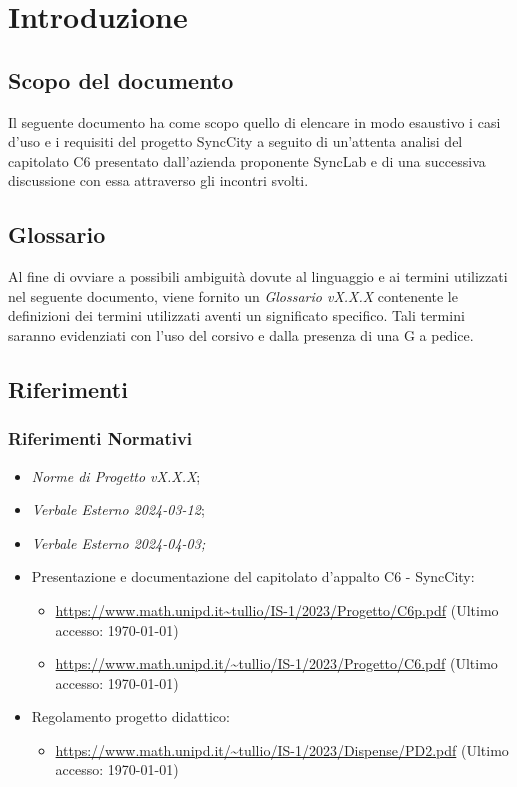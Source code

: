 \documentclass[8pt]{article}
\begin{document}
\section{Introduzione}
\subsection{Scopo del documento}
Il seguente documento ha come scopo quello di elencare in modo esaustivo i casi d'uso e i requisiti
del progetto SyncCity a seguito di un'attenta analisi del capitolato C6 presentato dall'azienda proponente SyncLab e di una successiva discussione con essa attraverso gli incontri svolti.

\subsection{Glossario}
Al fine di ovviare a possibili ambiguità dovute al linguaggio e ai termini utilizzati nel seguente
documento, viene fornito un \textit{Glossario vX.X.X} contenente le definizioni dei termini utilizzati aventi un significato specifico. Tali termini saranno evidenziati con l'uso del corsivo e dalla presenza di una G a pedice.
\subsection{Riferimenti}
\subsubsection{Riferimenti Normativi}
\begin{itemize}
	\setlength\itemsep{0em}
	\item \textit{Norme di Progetto vX.X.X};	
	\item \textit{Verbale Esterno 2024-03-12};
	\item \textit{Verbale Esterno 2024-04-03;}
  \item Presentazione e documentazione del capitolato d’appalto C6 - SyncCity:
	\begin{itemize}
		\item \href{https://www.math.unipd.it/~tullio/IS-1/2023/Progetto/C6p.pdf}{https://www.math.unipd.it\textasciitilde{}tullio/IS-1/2023/Progetto/C6p.pdf} (Ultimo accesso: \today)
		\item \href{https://www.math.unipd.it/~tullio/IS-1/2023/Progetto/C6.pdf}{https://www.math.unipd.it/\textasciitilde{}tullio/IS-1/2023/Progetto/C6.pdf} (Ultimo accesso: \today)
\end{itemize}
	\item Regolamento progetto didattico: 
      \begin{itemize}
          \item \href{https://www.math.unipd.it/~tullio/IS-1/2023/Dispense/PD2.pdf}{https://www.math.unipd.it/\textasciitilde{}tullio/IS-1/2023/Dispense/PD2.pdf} (Ultimo accesso: \today)
    \end{itemize}
\end{itemize}
\end{document}
